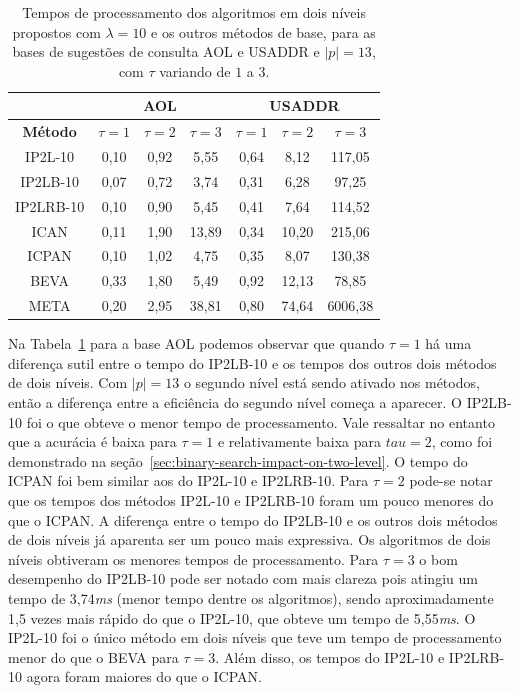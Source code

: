 \begin{table}[h]
\centering
\begin{tabular}{c|c|c|c|c|c|c|}
\cline{2-7}
 & \multicolumn{3}{c|}{\textbf{AOL}} & \multicolumn{3}{c|}{\textbf{USADDR}} \\ \hline
\multicolumn{1}{|c|}{\textbf{Método}} & $\tau=1$ & $\tau=2$ & $\tau=3$ & $\tau=1$ & $\tau=2$ & $\tau=3$ \\ \hline
\multicolumn{1}{|c|}{IP2L-10} & 0,10 & 0,92 & 5,55 & 0,64 & 8,12 & 117,05 \\ \hline
\multicolumn{1}{|c|}{IP2LB-10} & 0,07 & 0,72 & 3,74 & 0,31 & 6,28 & 97,25 \\ \hline
\multicolumn{1}{|c|}{IP2LRB-10} & 0,10 & 0,90 & 5,45 & 0,41 & 7,64 & 114,52 \\ \hline
\multicolumn{1}{|c|}{ICAN} & 0,11 & 1,90 & 13,89 & 0,34 & 10,20 & 215,06 \\ \hline
\multicolumn{1}{|c|}{ICPAN} & 0,10 & 1,02 & 4,75 & 0,35 & 8,07 & 130,38 \\ \hline
\multicolumn{1}{|c|}{BEVA} & 0,33 & 1,80 & 5,49 & 0,92 & 12,13 & 78,85 \\ \hline
\multicolumn{1}{|c|}{META} & 0,20 & 2,95 & 38,81 & 0,80 & 74,64 & 6006,38 \\ \hline
\end{tabular}
\caption{Tempos de processamento dos algoritmos em dois níveis propostos com $\lambda=10$ e os outros métodos de base, para as bases de sugestões de consulta AOL e USADDR e $|p|=13$, com $\tau$ variando de $1$ a $3$.}
\label{tab:baselines-varying-tau-p-13}
\end{table}

Na Tabela~\ref{tab:baselines-varying-tau-p-13} para a base AOL podemos observar que quando $\tau=1$ há uma diferença sutil entre o tempo do IP2LB-10 e os tempos dos outros dois métodos de dois níveis. Com $|p|=13$ o segundo nível está sendo ativado nos métodos, então a diferença entre a eficiência do segundo nível começa a aparecer. O IP2LB-10 foi o que obteve o menor tempo de processamento. Vale ressaltar no entanto que a acurácia é baixa para $\tau=1$ e relativamente baixa para $tau=2$, como foi demonstrado na seção~\ref{sec:binary-search-impact-on-two-level}. O tempo do ICPAN foi bem similar aos do IP2L-10 e IP2LRB-10. Para $\tau=2$ pode-se notar que os tempos dos métodos IP2L-10 e IP2LRB-10 foram um pouco menores do que o ICPAN. A diferença entre o tempo do IP2LB-10 e os outros dois métodos de dois níveis já aparenta ser um pouco mais expressiva. Os algoritmos de dois níveis obtiveram os menores tempos de processamento. Para $\tau=3$ o bom desempenho do IP2LB-10 pode ser notado com mais clareza pois atingiu um tempo de 3,74\textit{ms} (menor tempo dentre os algoritmos), sendo aproximadamente 1,5 vezes mais rápido do que o IP2L-10, que obteve um tempo de 5,55\textit{ms}. O IP2L-10 foi o único método em dois níveis que teve um tempo de processamento menor do que o BEVA para $\tau=3$. Além disso, os tempos do IP2L-10 e IP2LRB-10 agora foram maiores do que o ICPAN.

